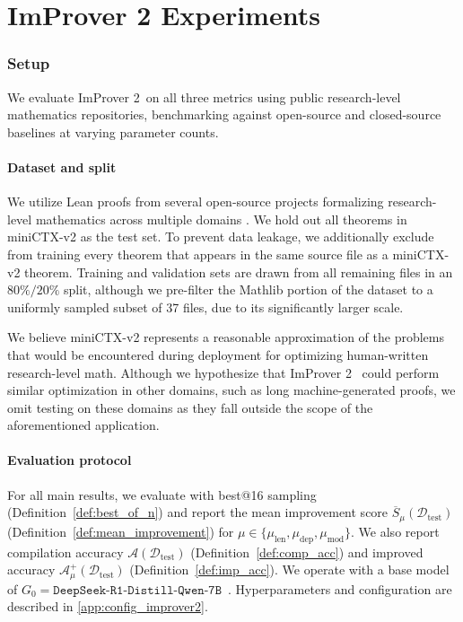 \chapter{ImProver 2 Experiments}\label{chap:improver2-exp}

\setlength{\parindent}{1em}


\subsection{Setup}
\label{sec:exp_setup}

We evaluate ImProver 2\ on all three metrics using public research-level
mathematics repositories, benchmarking against open-source and closed-source
baselines at varying parameter counts.

\subsubsection{Dataset and split}


We utilize Lean proofs from several open-source projects formalizing research-level mathematics across multiple domains \cite{Mathlib, HEPLean, PFR, Carleson, ConNF, FLT, Foundation, Seymour}. We hold out all theorems in miniCTX-v2 as the test set. To prevent
data leakage, we additionally exclude from training every theorem
that appears in the same source file as a miniCTX-v2 theorem.
Training and validation sets are drawn from all remaining files
in an $80\%/20\%$ split, although we pre-filter the Mathlib portion of the dataset to a uniformly sampled subset of 37 files, due to its significantly larger scale.

We believe miniCTX-v2 represents a reasonable approximation of the problems that would be encountered during deployment for optimizing human-written research-level math. Although we hypothesize that ImProver 2 \ could perform similar optimization in other domains, such as long machine-generated proofs, we omit testing on these domains as they fall outside the scope of the aforementioned application. 

\subsubsection{Evaluation protocol}

For all main results, we evaluate with best@16 sampling (Definition~\ref{def:best_of_n}) and report the mean improvement score $\overline{S}_\mu(\mathcal{D}_{\mathrm{test}})$ (Definition~\ref{def:mean_improvement}) for $\mu \in \{\mu_{\mathrm{len}}, \mu_{\mathrm{dep}}, \mu_{\mathrm{mod}}\}$. We also report compilation accuracy $\mathcal{A}(\mathcal{D}_{\mathrm{test}})$ (Definition~\ref{def:comp_acc}) and improved accuracy $\mathcal{A}^+_\mu(\mathcal{D}_{\mathrm{test}})$ (Definition~\ref{def:imp_acc}). We operate with a base model of $G_0 = \texttt{DeepSeek-R1-Distill-Qwen-7B}$~\cite{DeepseekR1}. Hyperparameters and configuration are described in \ref{app:config_improver2}.


